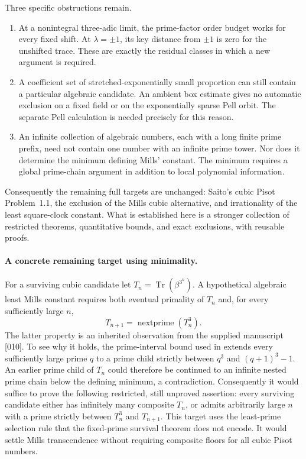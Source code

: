 \documentclass[11pt,a4paper]{article}
\theoremstyle{remark}\newtheorem{remark}[theorem]{Remark}
\newcommand{\Tr}{\operatorname{Tr}}\newcommand{\Nm}{\operatorname{N}}
\begin{document}
Three specific obstructions remain.
\begin{enumerate}
\item At a nonintegral three-adic limit, the prime-factor order
budget works for every fixed shift. At $\lambda=\pm1$, its key
distance from $\pm1$ is zero for the unshifted trace. These are
exactly the residual classes in which a new argument is required.
\item A coefficient set of stretched-exponentially small proportion
can still contain a particular algebraic candidate. An ambient
box estimate gives no automatic exclusion on a fixed field or on
the exponentially sparse Pell orbit. The separate Pell calculation
is needed precisely for this reason.
\item An infinite collection of algebraic numbers, each with a
long finite prime prefix, need not contain one number with an
infinite prime tower. Nor does it determine the minimum defining
Mills' constant. The minimum requires a global prime-chain argument
in addition to local polynomial information.
\end{enumerate}
Consequently the remaining full targets are unchanged: Saito's
cubic Pisot Problem~1.1, the exclusion of the Mills cubic alternative,
and irrationality of the least square-clock constant. What is
established here is a stronger collection of restricted theorems, quantitative bounds, and exact exclusions, with reusable proofs.

\paragraph{A concrete remaining target using minimality.}
For a surviving cubic candidate let $T_n=\Tr(\beta^{3^n})$.
A hypothetical algebraic least Mills constant requires both eventual
primality of $T_n$ and, for every sufficiently large $n$,
\[
 T_{n+1}=\operatorname{nextprime}(T_n^3).
\]
The latter property is an inherited observation from the supplied
manuscript [010]. To see why it holds, the prime-interval bound used
in \cite{SaitoVariants} extends every sufficiently large prime $q$
to a prime child strictly between $q^3$ and $(q+1)^3-1$.
An earlier prime child of $T_n$ could therefore be continued to an
infinite nested prime chain below the defining minimum, a contradiction.
Consequently it would suffice to prove the following restricted,
still unproved assertion: every surviving candidate either has
infinitely many composite $T_n$, or admits arbitrarily large $n$
with a prime strictly between $T_n^3$ and $T_{n+1}$.
This target uses the least-prime selection rule that the fixed-prime
survival theorem does not encode. It would settle Mills transcendence
without requiring composite floors for all cubic Pisot numbers.
\end{document}
